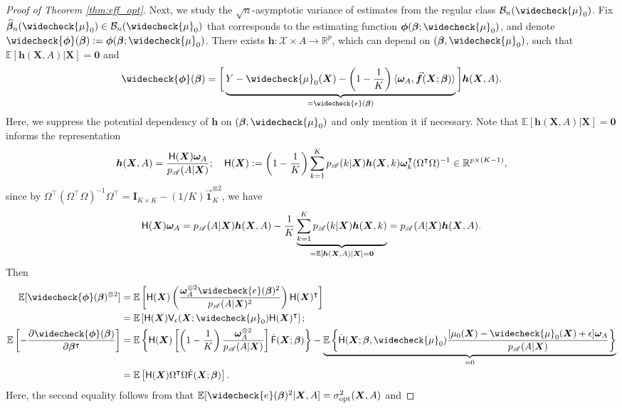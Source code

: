 \documentclass[11pt]{article}
\numberwithin{equation}{section}
\theoremstyle{definition}
\theoremstyle{remark}
\newcommand{\bbf}{\bm{f}}
\newcommand{\bh}{\bm{h}}
\newcommand{\Ib}{\mathbf{I}}
\newcommand{\bX}{\bm{X}}
\newcommand{\bbeta}{\bm{\beta}}
\newcommand{\bomega}{\bm{\omega}}
\newcommand{\bphi}{\bm{\phi}}
\newcommand{\bbE}{\mathbb{E}}
\newcommand{\bbR}{\mathbb{R}}
\newcommand{\cB}{\mathcal{B}}
\newcommand{\cX}{\mathcal{X}}
\newcommand{\sA}{\mathscr{A}}
\newcommand{\sfF}{\mathsf{F}}
\newcommand{\sfH}{\mathsf{H}}
\newcommand{\sfV}{\mathsf{V}}
\newcommand{\bzero}{\mathbf{0}}	%
\newcommand{\bone}{\mathbf{1}}	%
\newcommand{\opt}{\mathrm{opt}}
\begin{document}
\begin{proof}[Proof of Theorem \ref{thm:eff_opt}]
	Next, we study the $ \sqrt{n} $-asymptotic variance of estimates from the regular class $ \cB_{n}(\widecheck{\mu}_{0}) $. Fix $ \widehat{\bbeta}_{n}(\widecheck{\mu}_{0}) \in \cB_{n}(\widecheck{\mu}_{0}) $ that corresponds to the estimating function $ \bphi(\bbeta;\widecheck{\mu}_{0}) $, and denote $ \widecheck{\bphi}(\bbeta) := \bphi(\bbeta;\widecheck{\mu}_{0}) $. There exists $ \bh:\cX\times A\to \bbR^{p} $, which can depend on $ (\bbeta,\widecheck{\mu}_{0}) $, such that $ \bbE[\bh(\bX,A)|\bX] = \bzero $ and
	\[ \widecheck{\bphi}(\bbeta) = \bigg[\underbrace{Y - \widecheck{\mu}_{0}(\bX) - \left( 1 - {1 \over K} \right) \langle \bomega_{A},\vec{\bbf}(\bX;\bbeta) \rangle}_{= \widecheck{e}(\bbeta)} \bigg]\bh(\bX,A). \]
	Here, we suppress the potential dependency of $ \bh $ on $ (\bbeta,\widecheck{\mu}_{0}) $ and only mention it if necessary. Note that $ \bbE[\bh(\bX,A)|\bX] = \bzero $ informs the representation
	\[ \bh(\bX,A) = {\sfH(\bX)\bomega_{A} \over p_{\sA}(A|\bX)}; \quad \sfH(\bX) := \left( 1 - {1 \over K} \right)\sum_{k=1}^{K}p_{\sA}(k|\bX)\bh(\bX,k)\bomega_{k}^{\intercal}(\Omega^{\intercal}\Omega)^{-1} \in \bbR^{p\times (K-1)}, \]
	since by $ \Omega^{\intercal}(\Omega^{\intercal}\Omega)^{-1}\Omega^{\intercal} = \Ib_{K\times K} - (1/K)\vec{\bone}_{K}^{\otimes 2} $, we have
	\[ \sfH(\bX)\bomega_{A} = p_{\sA}(A|\bX)\bh(\bX,A) - {1 \over K}\underbrace{\sum_{k = 1}^{K}p_{\sA}(k|\bX)\bh(\bX,k)}_{= \bbE[\bh(\bX,A)|\bX] = \bzero} = p_{\sA}(A|\bX)\bh(\bX,A). \]
	Then
	\begin{align*}
		\bbE[\widecheck{\bphi}(\bbeta)^{\otimes 2}] &= \bbE\left[ \sfH(\bX)\left( {\bomega_{A}^{\otimes 2}\widecheck{e}(\bbeta)^{2} \over p_{\sA}(A|\bX)^{2}} \right)\sfH(\bX)^{\intercal} \right]\\
		&= \bbE\left[ \sfH(\bX) \sfV_{\epsilon}(\bX;\widecheck{\mu}_{0}) \sfH(\bX)^{\intercal} \right];\\
		\bbE \left[-{\partial\widecheck{\bphi}(\bbeta) \over \partial \bbeta^{\intercal}}\right] &= \bbE\left\{ \sfH(\bX)\left[ \left( 1 - {1 \over K} \right){\bomega_{A}^{\otimes 2} \over p_{\sA}(A|\bX)} \right]\dot{\sfF}(\bX;\bbeta) \right\} - \underbrace{\bbE\left\{ \dot{\sfH}(\bX;\bbeta,\widecheck{\mu}_{0}){[\mu_{0}(\bX) - \widecheck{\mu}_{0}(\bX) + \epsilon]\bomega_{A} \over p_{\sA}(A|\bX)} \right\}}_{= 0}\\
		&= \bbE\left[ \sfH(\bX)\Omega^{\intercal}\Omega\dot{\sfF}(\bX;\bbeta) \right].
	\end{align*}
	Here, the second equality follows from that $ \bbE[\widecheck{e}(\bbeta)^{2}|\bX,A] = \sigma_{\opt}^{2}(\bX,A) $ and

\end{proof}
\end{document}
